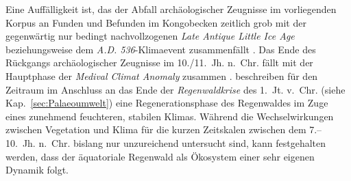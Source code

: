 Eine Auffälligkeit ist, das der Abfall archäologischer Zeugnisse im vorliegenden Korpus an Funden und Befunden im Kongobecken zeitlich grob mit der gegenwärtig nur bedingt nachvollzogenen \textit{Late Antique Little Ice Age} beziehungsweise dem \textit{A.D. 536}-Klimaevent zusammenfällt \parencites[siehe][]{Larsen.2008}{Buntgen.2016}. Das Ende des Rückgangs archäologischer Zeugnisse im 10./11.~Jh. n.~Chr. fällt mit der Hauptphase der \textit{Medival Climat Anomaly} zusammen \parencites{Luning.2017}{Luning.2018}. \textcite[337]{Hubau.2013} beschreiben für den Zeitraum im Anschluss an das Ende der \textit{Regenwaldkrise} des 1.~Jt. v.~Chr. (siehe Kap.~\ref{sec:Palaeoumwelt}) eine Regenerationsphase des Regenwaldes im Zuge eines zunehmend feuchteren, stabilen Klimas. Während die Wechselwirkungen zwischen Vegetation und Klima für die kurzen Zeitskalen zwischen dem 7.--10.~Jh. n.~Chr. bislang nur unzureichend untersucht sind, kann festgehalten werden, dass der äquatoriale Regenwald als Ökosystem einer sehr eigenen Dynamik folgt.

